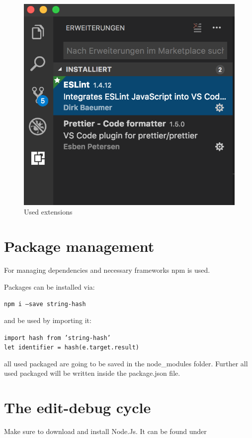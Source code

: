 \begin{figure}[H]
	\centering
	\includegraphics[scale=0.5]{bilder/cyto/LINT.png}
	\caption{Used extensions}
	\label{fig:Extensions}
\end{figure}

\section{Package management}
For managing dependencies and necessary frameworks npm is used. 

Packages can be installed via:

	\texttt{npm i ---save string-hash}

and be used by importing it:

	\texttt{import hash from 'string-hash'} \\
	\texttt{let identifier = hash(e.target.result)}

all used packaged are going to be saved in the node\_modules
folder. Further all used packaged will be written inside the
package.json file.


\section{The edit-debug cycle}

Make sure to download and install Node.Js. It can be found under

